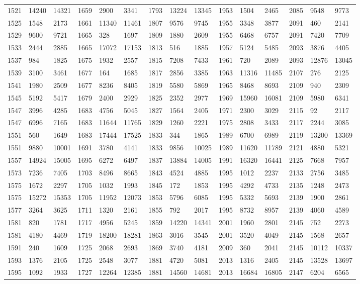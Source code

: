 \begin{longtable}{*4{A@{\hspace*{5mm}}A}}
	1521&14240&14321&1659&2900&3341&1793&13224&13345&1953&1504&2465&2085&9548&9773\\
	1525&1548&2173&1661&11340&11461&1807&9576&9745&1955&3348&3877&2091&460&2141\\
	1529&9600&9721&1665&328&1697&1809&1880&2609&1955&6468&6757&2091&7420&7709\\
	1533&2444&2885&1665&17072&17153&1813&516&1885&1957&5124&5485&2093&3876&4405\\
	1537&984&1825&1675&1932&2557&1815&7208&7433&1961&720&2089&2093&12876&13045\\
	1539&3100&3461&1677&164&1685&1817&2856&3385&1963&11316&11485&2107&276&2125\\
	1541&1980&2509&1677&8236&8405&1819&5580&5869&1965&8468&8693&2109&940&2309\\
	1545&5192&5417&1679&2400&2929&1825&2352&2977&1969&15960&16081&2109&5980&6341\\
	1547&3996&4285&1683&4756&5045&1827&1564&2405&1971&2300&3029&2115&92&2117\\
	1547&6996&7165&1683&11644&11765&1829&1260&2221&1975&2808&3433&2117&2244&3085\\
	1551&560&1649&1683&17444&17525&1833&344&1865&1989&6700&6989&2119&13200&13369\\
	1551&9880&10001&1691&3780&4141&1833&9856&10025&1989&11620&11789&2121&4880&5321\\
	1557&14924&15005&1695&6272&6497&1837&13884&14005&1991&16320&16441&2125&7668&7957\\
	1573&7236&7405&1703&8496&8665&1843&4524&4885&1995&1012&2237&2133&2756&3485\\
	1575&1672&2297&1705&1032&1993&1845&172&1853&1995&4292&4733&2135&1248&2473\\
	1575&15272&15353&1705&11952&12073&1853&5796&6085&1995&5332&5693&2139&1900&2861\\
	1577&3264&3625&1711&1320&2161&1855&792&2017&1995&8732&8957&2139&4060&4589\\
	1581&820&1781&1717&4956&5245&1859&14220&14341&2001&1960&2801&2145&752&2273\\
	1581&4180&4469&1719&18200&18281&1863&3016&3545&2001&3520&4049&2145&1568&2657\\
	1591&240&1609&1725&2068&2693&1869&3740&4181&2009&360&2041&2145&10112&10337\\
	1593&1376&2105&1725&2548&3077&1881&4720&5081&2013&1316&2405&2145&13528&13697\\
	1595&1092&1933&1727&12264&12385&1881&14560&14681&2013&16684&16805&2147&6204&6565\\

\end{longtable}
